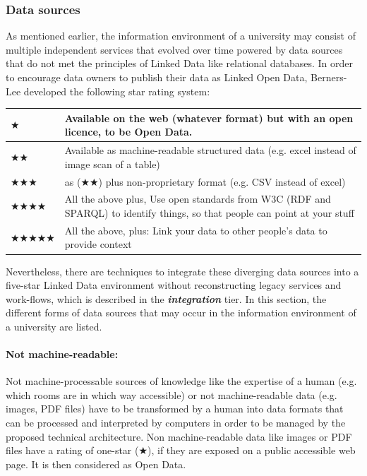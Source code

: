 \documentclass{article}
\begin{document}
\subsubsection{Data sources}
\label{technical-architecture-challenges:proposal:data-source}
As mentioned earlier, the information environment of a university may consist of multiple independent services that evolved over time powered by data sources that do not met the principles of Linked Data like relational databases. In order to encourage data owners to publish their data as Linked Open Data, Berners-Lee developed the following star rating system: \cite{berners-lee_linked_2006}\\
\begin{center}
\begin{tabular}{p{2cm}  p{10cm}}
		$\bigstar$ & Available on the web (whatever format) but with an open licence, to be Open Data. \\
		\hline
		$\bigstar\bigstar$ & Available as machine-readable structured data (e.g. excel instead of image scan of a table)\\
		\hline
		$\bigstar\bigstar\bigstar$ & as ($\bigstar\bigstar$) plus non-proprietary format (e.g. CSV instead of excel)\\
		\hline
		$\bigstar\bigstar\bigstar\bigstar$ & All the above plus, Use open standards from W3C (RDF and SPARQL) to identify things, so that people can point at your stuff\\
		\hline
		$\bigstar\bigstar\bigstar\bigstar\bigstar$ & All the above, plus: Link your data to other people’s data to provide context\\
\end{tabular}
\end{center}
Nevertheless, there are techniques to integrate these diverging data sources into a five-star Linked Data environment without reconstructing legacy services and work-flows, which is described in the \textbf{\textit{integration}} tier. In this section, the different forms of data sources that may occur in the information environment of a university are listed. 

\paragraph{Not machine-readable:} Not machine-processable sources of knowledge like the expertise of a human (e.g. which rooms are in which way accessible) or not machine-readable data (e.g. images, PDF files) have to be transformed by a human into data formats that can be processed and interpreted by computers in order to be managed by the proposed technical architecture. Non machine-readable data like images or PDF files have a rating of one-star ($\bigstar$), if they are exposed on a public accessible web page. It is then considered as Open Data.
\end{document}
